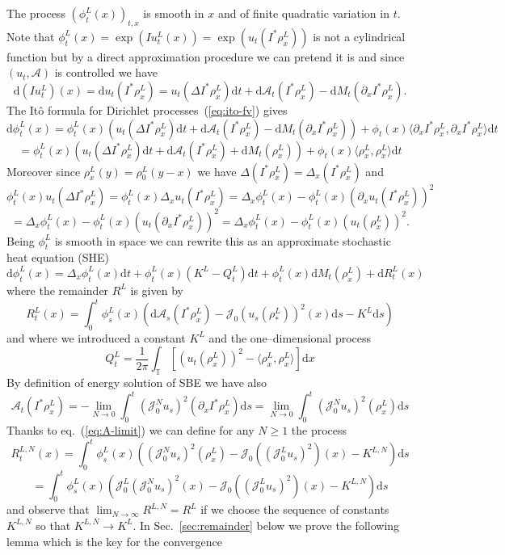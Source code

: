 \documentclass[a4paper,11pt]{article}
\newcommand{\mathd}{\mathrm{d}}
\newcommand{\JJ}{\mathcal{J}}
\begin{document}
The process $(\phi_t^L (x))_{t, x}$ is smooth in $x$ and of finite quadratic
variation in $t$. Note that $\phi_t^L (x) = \exp (I u_t^L (x)) = \exp (u_t
(I^{\ast} \rho^L_x))$ is not a cylindrical function but by a direct
approximation procedure we can pretend it is and since $(u_t, \mathcal{A})$ is
controlled we have
\[ \mathd (I u_t^L) (x) = \mathd u_t (I^{\ast} \rho^L_x) = u_t (\Delta
   I^{\ast} \rho^L_x) \mathd t + \mathd \mathcal{A}_t (I^{\ast} \rho^L_x) -
   \mathd M_t (\partial_x I^{\ast} \rho^L_x) . \]
The It{\^o} formula for Dirichlet processes~(\ref{eq:ito-fv}) gives
\[ \mathd \phi_t^L (x) = \phi_t^L (x) (u_t (\Delta I^{\ast} \rho^L_x) \mathd t
   + \mathd \mathcal{A}_t (I^{\ast} \rho^L_x) - \mathd M_t (\partial_x
   I^{\ast} \rho^L_x)) + \phi_t (x) \langle \partial_x I^{\ast} \rho^L_x,
   \partial_x I^{\ast} \rho^L_x \rangle \mathd t \]
\[ = \phi_t^L (x) (u_t (\Delta I^{\ast} \rho^L_x) \mathd t + \mathd
   \mathcal{A}_t (I^{\ast} \rho^L_x) + \mathd M_t (\rho^L_x)) + \phi_t (x)
   \langle \rho^L_x, \rho^L_x \rangle \mathd t \]
Moreover since $\rho^L_x (y) = \rho^L_0 (y - x)$ we have $\Delta (I^{\ast}
\rho^L_x) = \Delta_x (I^{\ast} \rho^L_x)$ and
\[ \phi_t^L (x) u_t (\Delta I^{\ast} \rho^L_x) = \phi_t^L (x) \Delta_x u_t
   (I^{\ast} \rho^L_x) = \Delta_x \phi_t^L (x) - \phi_t^L (x) (\partial_x u_t
   (I^{\ast} \rho^L_x))^2 \]
\[ = \Delta_x \phi_t^L (x) - \phi_t^L (x) (u_t (\partial_x I^{\ast}
   \rho^L_x))^2 = \Delta_x \phi_t^L (x) - \phi_t^L (x) (u_t (\rho^L_x))^2 . \]
Being $\phi_t^L$ is smooth in space we can rewrite this as an approximate
stochastic heat equation (SHE)
\[ \mathd \phi_t^L (x) = \Delta_x \phi_t^L (x) \mathd t + \phi_t^L (x) (K^L -
   Q_t^L) \mathd t + \phi_t^L (x) \mathd M_t (\rho_x^L) + \mathd R_t^L (x) \]
where the remainder $R^L$ is given by
\[ R_t^L (x) = \int_0^t \phi_s^L (x) (\mathd \mathcal{A}_s (I^{\ast} \rho^L_x)
   - \JJ_0 (u_s (\rho^L_{\ast}))^2 (x) \mathd s - K^L \mathd s) \]
and where we introduced a constant $K^L$ and the one--dimensional process
\[ Q_t^L = \frac{1}{2 \pi} \int_{\mathbb{T}} [(u_t (\rho^L_x))^2 - \langle
   \rho^L_x, \rho^L_x \rangle] \mathd x \]
By definition of energy solution of SBE we have also
\begin{equation}
  \mathcal{A}_t (I^{\ast} \rho_x^L) = - \lim_{N \rightarrow 0} \int_0^t \left(
  \JJ^N_0 u_s \right)^2 (\partial_x I^{\ast} \rho^L_x) \mathd s = \lim_{N
  \rightarrow 0} \int_0^t \left( \JJ^N_0 u_s \right)^2 (\rho^L_x) \mathd s
  \label{eq:A-limit}
\end{equation}
Thanks to eq.~(\ref{eq:A-limit}) we can define for any $N \geqslant 1$ the
process
\[ R_t^{L, N} (x) = \int_0^t \phi_s^L (x) (\left( \JJ^N_0 u_s \right)^2
   (\rho^L_x) - \JJ_0 \left( (\JJ^L_0 u_s)^2 \right) (x) - K^{L, N}) \mathd s
\]
\[ = \int_0^t \phi_s^L (x) (\JJ^L_0 \left( \JJ^N_0 u_s \right)^2 (x) - \JJ_0
   \left( (\JJ^L_0 u_s)^2 \right) (x) - K^{L, N}) \mathd s \]
and observe that $\lim_{N \rightarrow \infty} R^{L, N} = R^L$ if we choose the
sequence of constants $K^{L, N}$ so that $K^{L, N} \rightarrow K^L$. In
Sec.~\ref{sec:remainder} below we prove the following lemma which is the key
for the convergence
\end{document}
